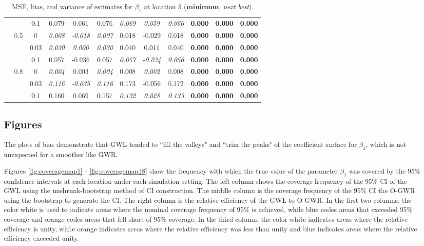 \documentclass[authoryear, review, 11pt]{elsarticle}
\begin{document}
\begin{table}[ht]
\begin{center}
\begin{tabular}{ccc | ccc | ccc | ccc }
 &  & 0.1 &   0.079 & 0.061 & 0.076 & \emph{0.069} & \emph{0.059} & \emph{0.066} & \textbf{0.000} & \textbf{0.000} & \textbf{0.000} \\ \cline{2-12}
 & \multirow{3}{*}{0.5} & 0 &   \emph{0.008} & \emph{-0.018} & \emph{0.007} & 0.018 & -0.029 & 0.018 & \textbf{0.000} & \textbf{0.000} & \textbf{0.000} \\ 
 &  & 0.03 &   \emph{0.030} & \emph{0.000} & \emph{0.030} & 0.040 & 0.011 & 0.040 & \textbf{0.000} & \textbf{0.000} & \textbf{0.000} \\ 
 &  & 0.1 &   0.057 & -0.036 & 0.057 & \emph{0.057} & \emph{-0.034} & \emph{0.056} & \textbf{0.000} & \textbf{0.000} & \textbf{0.000} \\ \cline{2-12}
 & \multirow{3}{*}{0.8} & 0 &   \emph{0.004} & 0.003 & \emph{0.004} & 0.008 & \emph{0.002} & 0.008 & \textbf{0.000} & \textbf{0.000} & \textbf{0.000} \\ 
 &  & 0.03 &   \emph{0.116} & \emph{-0.035} & \emph{0.116} & 0.173 & -0.056 & 0.172 & \textbf{0.000} & \textbf{0.000} & \textbf{0.000} \\ 
 &  & 0.1 &   0.160 & 0.069 & 0.157 & \emph{0.132} & \emph{0.028} & \emph{0.133} & \textbf{0.000} & \textbf{0.000} & \textbf{0.000} \\ 
  \end{tabular}
\caption{MSE, bias, and variance of estimates for $\beta_1$ at location 5 (\textbf{minimum}, \emph{next best}).}
\end{center}
\end{table}



	\subsection{Figures}
	The plots of bias demonstrate that GWL tended to ``fill the valleys" and ``trim the peaks" of the coefficient surface for $\beta_1$, which is not unexpected for a smoother like GWR. 
	
	Figures \ref{fig:coveragemap1} - \ref{fig:coveragemap18} show the frequency with which the true value of the parameter $\beta_1$ was covered by the 95\% confidence intervals at each location under each simulation setting. The left column shows the coverage frequency of the 95\% CI of the GWL using the unshrunk-bootstrap method of CI construction. The middle column is the coverage frequency of the 95\% CI the O-GWR using the bootstrap to generate the CI. The right column is the relative efficiency of the GWL to O-GWR. In the first two columns, the color white is used to indicate areas where the nominal coverage frequency of 95\% is achieved, while blue codes areas that exceeded 95\% coverage and orange codes areas that fell short of 95\% coverage. In the third column, the color white indicates areas where the relative efficiency is unity, while orange indicates areas where the relative efficiency was less than unity and blue indicates areas where the relative efficiency exceeded unity.\\	
	
\end{document}
